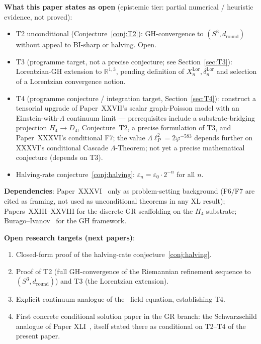 \documentclass[12pt]{article}
\theoremstyle{definition}
\theoremstyle{remark}
\begin{document}
\textbf{What this paper states as open} (epistemic tier: partial numerical / heuristic evidence, not proved):
\begin{itemize}
\item T2 unconditional (Conjecture~\ref{conj:T2}): GH-convergence to $(S^3, d_{\mathrm{round}})$ without appeal to BI-sharp or halving. Open.
\item T3 (programme target, not a precise conjecture; see Section~\ref{sec:T3}): Lorentzian-GH extension to $\mathbb{R}^{1,3}$, pending definition of $X_n^{\mathrm{Lor}}, \delta_n^{\mathrm{Lor}}$ and selection of a Lorentzian convergence notion.
\item T4 (programme conjecture / integration target, Section~\ref{sec:T4}): construct a tensorial upgrade of Paper~XXVII's scalar graph-Poisson model with an Einstein-with-$\Lambda$ continuum limit --- prerequisites include a substrate-bridging projection $H_4 \to D_4$, Conjecture~T2, a precise formulation of T3, and Paper~XXXVI's conditional F7; the value $\Lambda \ell_P^2 = 2\varphi^{-583}$ depends further on XXXVI's conditional Cascade $\Lambda$-Theorem; not yet a precise mathematical conjecture (depends on T3).
\item Halving-rate conjecture~\ref{conj:halving}: $\varepsilon_n = \varepsilon_0 \cdot 2^{-n}$ for all $n$.
\end{itemize}

\textbf{Dependencies}: Paper~XXXVI~\citep{SmartXXXVI} only as problem-setting background (F6/F7 are cited as framing, not used as unconditional theorems in any XL result); Papers~XXIII--XXVIII for the discrete GR scaffolding on the $H_4$ substrate; Burago--Ivanov~\citep{BBI2001} for the GH framework.

\textbf{Open research targets (next papers)}:
\begin{enumerate}
\item Closed-form proof of the halving-rate conjecture~\ref{conj:halving}.
\item Proof of T2 (full GH-convergence of the Riemannian refinement sequence to $(S^3, d_{\mathrm{round}})$) and T3 (the Lorentzian extension).
\item Explicit continuum analogue of the~\citep{SmartXXVII} field equation, establishing T4.
\item First concrete conditional solution paper in the GR branch: the Schwarzschild analogue of Paper XLI~\citep{SmartXLI}, itself stated there as conditional on T2--T4 of the present paper.
\end{enumerate}
\end{document}
